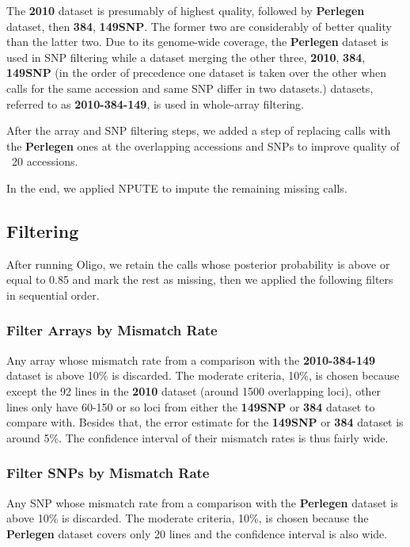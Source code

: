 \documentclass[a4paper,10pt]{article}
\begin{document}
The \textbf{2010} dataset is presumably of highest quality, followed by \textbf{Perlegen} dataset, then \textbf{384}, \textbf{149SNP}. The former two are considerably of better quality than the latter two. Due to its genome-wide coverage, the \textbf{Perlegen} dataset is used in SNP filtering while a dataset merging the other three, \textbf{2010}, \textbf{384}, \textbf{149SNP} (in the order of precedence one dataset is taken over the other when calls for the same accession and same SNP differ in two datasets.) datasets, referred to as \textbf{2010-384-149}, is used in whole-array filtering.

After the array and SNP filtering steps, we added a step of replacing calls with the \textbf{Perlegen} ones at the overlapping accessions and SNPs to improve quality of ~20 accessions.

In the end, we applied NPUTE \cite{RobertsEtAl2007} to impute the remaining missing calls.

\subsection{Filtering}
After running Oligo, we retain the calls whose posterior probability is above or equal to 0.85 and mark the rest as missing, then we applied the following filters in sequential order.

\subsubsection{Filter Arrays by Mismatch Rate}
Any array whose mismatch rate from a comparison with the \textbf{2010-384-149} dataset is above 10\% is discarded. The moderate criteria, 10\%, is chosen because except the 92 lines in the \textbf{2010} dataset (around 1500 overlapping loci), other lines only have 60-150 or so loci from either the \textbf{149SNP} or \textbf{384} dataset to compare with. Besides that, the error estimate for the \textbf{149SNP} or \textbf{384} dataset is around 5\%. The confidence interval of their mismatch rates is thus fairly wide.

\subsubsection{Filter SNPs by Mismatch Rate}
Any SNP whose mismatch rate from a comparison with the \textbf{Perlegen} dataset is above 10\% is discarded. The moderate criteria, 10\%, is chosen because the \textbf{Perlegen} dataset covers only 20 lines and the confidence interval is also wide.
\end{document}
